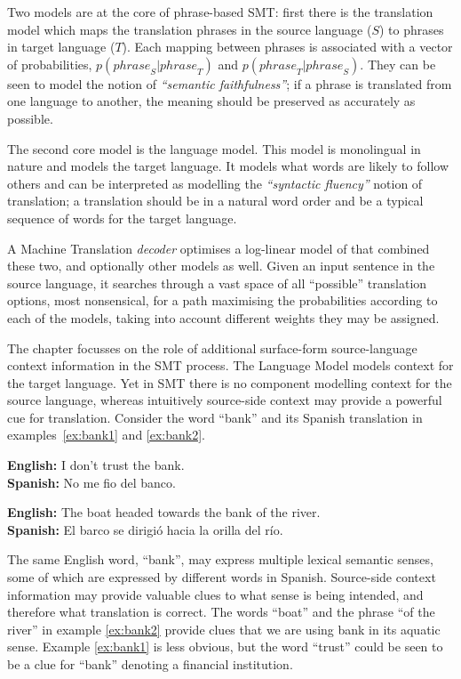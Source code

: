 Two models are at the core of phrase-based SMT: first there is the translation
model which maps the translation phrases in the source language ($S$) to
phrases in target language ($T$). Each mapping between phrases is associated
with a vector of probabilities, $p({phrase}_S|{phrase}_T)$ and
$p({phrase}_T|{phrase}_S)$. They can be seen to model the notion of
\emph{``semantic faithfulness''}; if a phrase is translated from one language
to another, the meaning should be preserved as accurately as possible.

The second core model is the language model. This model is monolingual
in nature and models the target language. It models what words are
likely to follow others and can be interpreted as modelling the
\emph{``syntactic fluency''} notion of translation; a translation should be
in a natural word order and be a typical sequence of words for the
target language.

A Machine Translation \emph{decoder} optimises a log-linear model of that
combined these two, and optionally other models as well. Given an input
sentence in the source language, it searches through a vast space of all
``possible'' translation options, most nonsensical, for a path maximising the
probabilities according to each of the models, taking into account different
weights they may be assigned.

The chapter focusses on the role of additional
surface-form source-language context information in the SMT process. The Language Model models context
for the target language. Yet in SMT there is no component modelling
context for the source language, whereas intuitively source-side context may
provide a powerful cue for translation. Consider the word ``bank'' and its
Spanish translation in examples~\ref{ex:bank1} and \ref{ex:bank2}.

\begin{exe} %
\ex \textbf{English:} I don't trust the bank. \\
    \textbf{Spanish:} No me fio del banco.
\label{ex:bank1}

\ex \textbf{English:} The boat headed towards the bank of the river. \\
    \textbf{Spanish:} El barco se dirigió hacia la orilla del río.
\label{ex:bank2}
\end{exe}

The same English word, ``bank'', may express multiple lexical semantic senses, some of
which are expressed by different words in Spanish. Source-side context
information may provide valuable clues to what sense is being intended, and
therefore what translation is correct.  The words ``boat'' and the phrase ``of
the river'' in example \ref{ex:bank2} provide clues that we are using
bank in its aquatic sense. Example \ref{ex:bank1} is less obvious, but the
word ``trust'' could be seen to be a clue for ``bank'' denoting a
financial institution.

